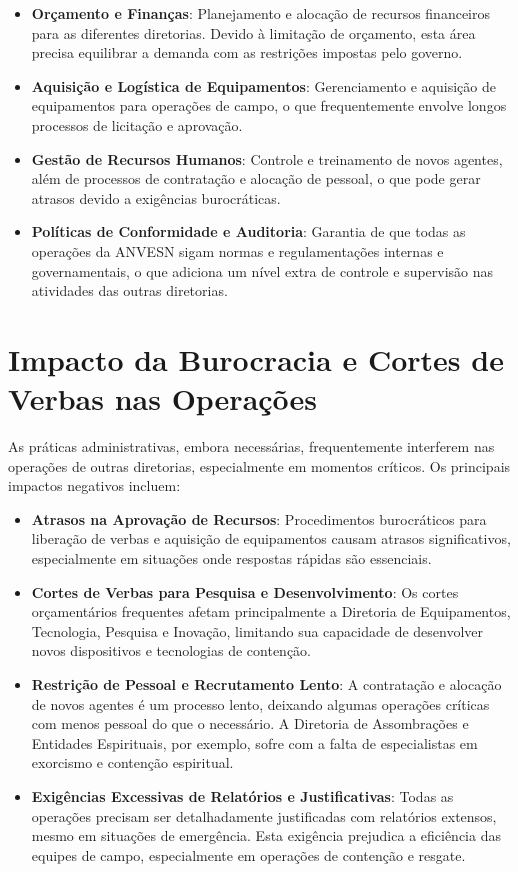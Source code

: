 \begin{itemize}
    \item \textbf{Orçamento e Finanças}: Planejamento e alocação de recursos financeiros para as diferentes diretorias. Devido à limitação de orçamento, esta área precisa equilibrar a demanda com as restrições impostas pelo governo.
    \item \textbf{Aquisição e Logística de Equipamentos}: Gerenciamento e aquisição de equipamentos para operações de campo, o que frequentemente envolve longos processos de licitação e aprovação.
    \item \textbf{Gestão de Recursos Humanos}: Controle e treinamento de novos agentes, além de processos de contratação e alocação de pessoal, o que pode gerar atrasos devido a exigências burocráticas.
    \item \textbf{Políticas de Conformidade e Auditoria}: Garantia de que todas as operações da ANVESN sigam normas e regulamentações internas e governamentais, o que adiciona um nível extra de controle e supervisão nas atividades das outras diretorias.
\end{itemize}

\section{Impacto da Burocracia e Cortes de Verbas nas Operações}
As práticas administrativas, embora necessárias, frequentemente interferem nas operações de outras diretorias, especialmente em momentos críticos. Os principais impactos negativos incluem:

\begin{itemize}
    \item \textbf{Atrasos na Aprovação de Recursos}: Procedimentos burocráticos para liberação de verbas e aquisição de equipamentos causam atrasos significativos, especialmente em situações onde respostas rápidas são essenciais.
    \item \textbf{Cortes de Verbas para Pesquisa e Desenvolvimento}: Os cortes orçamentários frequentes afetam principalmente a Diretoria de Equipamentos, Tecnologia, Pesquisa e Inovação, limitando sua capacidade de desenvolver novos dispositivos e tecnologias de contenção.
    \item \textbf{Restrição de Pessoal e Recrutamento Lento}: A contratação e alocação de novos agentes é um processo lento, deixando algumas operações críticas com menos pessoal do que o necessário. A Diretoria de Assombrações e Entidades Espirituais, por exemplo, sofre com a falta de especialistas em exorcismo e contenção espiritual.
    \item \textbf{Exigências Excessivas de Relatórios e Justificativas}: Todas as operações precisam ser detalhadamente justificadas com relatórios extensos, mesmo em situações de emergência. Esta exigência prejudica a eficiência das equipes de campo, especialmente em operações de contenção e resgate.
\end{itemize}

